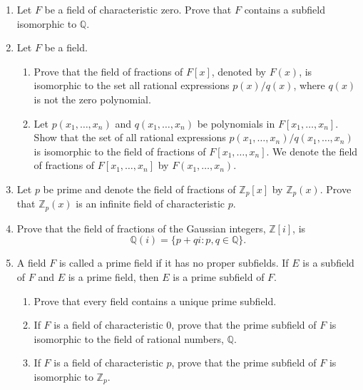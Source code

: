 {\begin{enumerate}
 
\item
Let $F$ be a field of characteristic zero. Prove that $F$ contains a
subfield isomorphic to ${\mathbb Q}$.
 
\item
Let $F$ be a field.
\begin{enumerate}

 \item
Prove that the field of fractions of $F[x]$, denoted by
$F(x)$\label{noteratfun},  is isomorphic to the set all rational
expressions $p(x) / q(x)$, where $q(x)$ is not the zero polynomial. 

 \item
Let $p(x_1, \ldots, x_n)$ and $q(x_1, \ldots, x_n)$ be polynomials in
$F[x_1, \ldots, x_n]$. Show that the set of all rational expressions
$p(x_1, \ldots, x_n) / q(x_1, \ldots, x_n)$ is isomorphic to the field
of fractions of $F[x_1, \ldots, x_n]$.  We denote the field of
fractions of $F[x_1, \ldots, x_n]$ by $F(x_1, \ldots,
x_n)$\label{noteratnvar}.    

\end{enumerate}


\item
Let $p$ be prime and denote the field of fractions of ${\mathbb Z}_p[x]$
by ${\mathbb Z}_p(x)$.  Prove that ${\mathbb Z}_p(x)$ is an infinite field
of characteristic $p$. 

 
\item
Prove that the field of fractions of the Gaussian integers, ${\mathbb
Z}[i]$, is 
\[
{\mathbb Q}(i) = \{ p + q i : p, q \in {\mathbb Q}  \}.
\]

 
\item
A field $F$ is called a {\bfi prime
field\/} if it has no proper
subfields. If $E$ is a subfield of $F$ and $E$ is a prime field, then  
$E$ is a {\bfi prime
subfield\/} of $F$. 
\begin{enumerate}
 
 \item
Prove that every field contains a unique prime subfield.
 
 \item
If $F$ is a field of characteristic 0, prove that the prime subfield
of $F$ is isomorphic to the field of rational numbers, ${\mathbb Q}$.
 
 \item
If $F$ is a field of characteristic $p$, prove that the prime subfield
of $F$ is isomorphic to  ${\mathbb Z}_p$. 
 

\end{enumerate}
\end{enumerate}}
